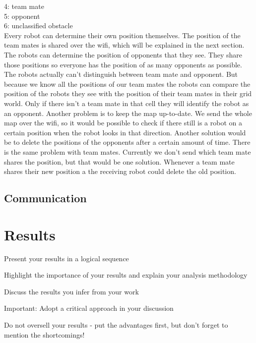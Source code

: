 \documentclass[lnicst,a4paper]{svmultln}
\begin{document}
4: team mate\\
5: opponent\\
6: unclassified obstacle\\
Every robot can determine their own position themselves. The position of the team mates is shared over the wifi, which will be explained in the next section. The robots can determine the position of opponents that they see. They share those positions so everyone has the position of as many opponents as possible. The robots actually can't distinguish between team mate and opponent. But because we know all the positions of our team mates the robots can compare the position of the robots they see with the position of their team mates in their grid world. Only if there isn't a team mate in that cell they will identify the robot as an opponent. Another problem is to keep the map up-to-date. We send the whole map over the wifi, so it would be possible to check if there still is a robot on a certain position when the robot looks in that direction. Another solution would be to delete the positions of the opponents after a certain amount of time. There is the same problem with team mates. Currently we don't send which team mate shares the position, but that would be one solution. Whenever a team mate shares their new position a the receiving robot could delete the old position.\\





\subsection{Communication}





\section{Results}
Present your results in a logical sequence

Highlight the importance of your results and explain your
analysis methodology

Discuss the results you infer from your work

Important:
Adopt a critical approach in your discussion

Do not oversell your results - put the advantages first, but
don’t forget to mention the shortcomings!
\end{document}
